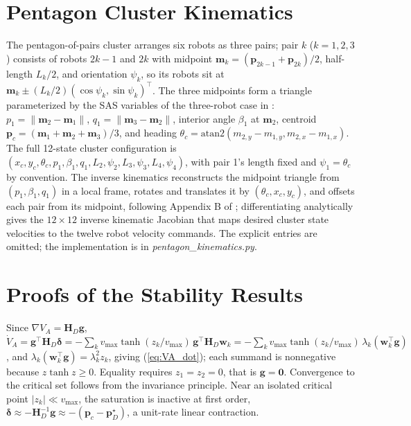 \documentclass[lettersize,journal]{IEEEtran}
\begin{document}
\section{Pentagon Cluster Kinematics}
\label{app:kinematics}

The pentagon-of-pairs cluster arranges six robots as three pairs; pair
$k$ ($k = 1, 2, 3$) consists of robots $2k-1$ and $2k$ with midpoint
$\mathbf{m}_k = (\mathbf{p}_{2k-1} + \mathbf{p}_{2k})/2$, half-length
$L_k/2$, and orientation $\psi_k$, so its robots sit at $\mathbf{m}_k
\pm (L_k/2)(\cos\psi_k, \sin\psi_k)^\top$. The three midpoints form a
triangle parameterized by the SAS variables of the three-robot case in
\cite{14}: $p_1 = \|\mathbf{m}_2 - \mathbf{m}_1\|$, $q_1 =
\|\mathbf{m}_3 - \mathbf{m}_2\|$, interior angle $\beta_1$ at
$\mathbf{m}_2$, centroid $\mathbf{p}_c = (\mathbf{m}_1 + \mathbf{m}_2 +
\mathbf{m}_3)/3$, and heading $\theta_c = \text{atan2}(m_{2,y} -
m_{1,y}, m_{2,x} - m_{1,x})$. The full 12-state cluster configuration
is $(x_c, y_c, \theta_c, p_1, \beta_1, q_1, L_2, \psi_2, L_3, \psi_3,
L_4, \psi_4)$, with pair 1's length fixed and $\psi_1 = \theta_c$ by
convention. The inverse kinematics reconstructs the midpoint triangle
from $(p_1, \beta_1, q_1)$ in a local frame, rotates and translates it
by $(\theta_c, x_c, y_c)$, and offsets each pair from its midpoint,
following Appendix B of \cite{14}; differentiating analytically gives
the $12 \times 12$ inverse kinematic Jacobian that maps desired cluster
state velocities to the twelve robot velocity commands. The explicit
entries are omitted; the implementation is in
\textit{pentagon\_kinematics.py}.


\section{Proofs of the Stability Results}
\label{app:proofs}

\begin{IEEEproof}
Since $\nabla V_A = \mathbf{H}_D \mathbf{g}$,
$\dot{V}_A = \mathbf{g}^\top \mathbf{H}_D \boldsymbol{\delta}
= -\sum_k v_{\max} \tanh(z_k/v_{\max})\,
\mathbf{g}^\top \mathbf{H}_D \mathbf{w}_k
= -\sum_k v_{\max} \tanh(z_k/v_{\max})\,\lambda_k
(\mathbf{w}_k^\top\mathbf{g})$, and $\lambda_k(\mathbf{w}_k^\top
\mathbf{g}) = \lambda_k^2 z_k$, giving (\ref{eq:VA_dot}); each summand
is nonnegative because $z\tanh z \geq 0$. Equality requires $z_1 = z_2 =
0$, that is $\mathbf{g} = \mathbf{0}$. Convergence to the critical set
follows from the invariance principle. Near an isolated critical point
$|z_k| \ll v_{\max}$, the saturation is inactive at first order,
$\boldsymbol{\delta} \approx -\mathbf{H}_D^{-1}\mathbf{g} \approx
-(\mathbf{p}_c - \mathbf{p}^\star_D)$, a unit-rate linear contraction.
\end{IEEEproof}
\end{document}
